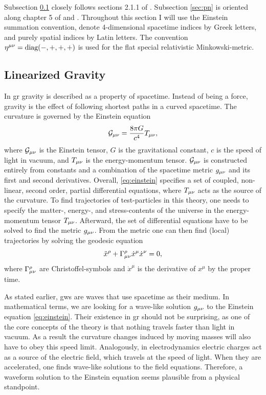 Subsection \ref{sec:linear_gravity} closely follows sections 2.1.1 of \cite{Schaefer:2019:MSC}. Subsection \ref{sec:pn} is oriented along chapter 5 of \cite{Maggiore:2008aaa} and \cite{Blanchet:2006aaa}. Throughout this section I will use the Einstein summation convention, denote 4-dimensional spacetime indices by Greek letters, and purely spatial indices by Latin letters. The convention $\eta^{\mu\nu}=\text{diag}{\left( -, +, +, + \right)}$ is used for the flat special relativistic Minkowski-metric.

\subsection{Linearized Gravity}\label{sec:linear_gravity}
In \acrshort{gr} gravity is described as a property of spacetime. Instead of being a force, gravity is the effect of following shortest paths in a curved spacetime. The curvature is governed by the Einstein equation
\begin{equation}\label{eq:einstein}
\mathcal{G}_{\mu\nu} = \frac{8\pi G}{c^4}T_{\mu\nu},
\end{equation}
where $\mathcal{G}_{\mu\nu}$ is the Einstein tensor, $G$ is the gravitational constant, $c$ is the speed of light in vacuum, and $T_{\mu\nu}$ is the energy-momentum tensor. $\mathcal{G}_{\mu\nu}$ is constructed entirely from constants and a combination of the spacetime metric $g_{\mu\nu}$ and its first and second derivatives. Overall, \eqref{eq:einstein} specifies a set of coupled, non-linear, second order, partial differential equations, where $T_{\mu\nu}$ acts as the source of the curvature. To find trajectories of test-particles in this theory, one needs to specify the matter-, energy-, and stress-contents of the universe in the energy-momentum tensor $T_{\mu\nu}$. Afterward, the set of differential equations have to be solved to find the metric $g_{\mu\nu}$. From the metric one can then find (local) trajectories by solving the geodesic equation
\begin{equation}\label{eq:geodesic_equation}
\ddot{x}^\rho + \Gamma^\rho_{\mu\nu}\dot{x}^\mu\dot{x}^\nu = 0,
\end{equation}
where $\Gamma^\rho_{\mu\nu}$ are Christoffel-symbols and $\dot{x}^\mu$ is the derivative of $x^\mu$ by the proper time.

As stated earlier, \acrshort{gw}s are waves that use spacetime as their medium. In mathematical terms, we are looking for a wave-like solution $g_{\mu\nu}$ to the Einstein equation \eqref{eq:einstein}. Their existence in \acrshort{gr} should not be surprising, as one of the core concepts of the theory is that nothing travels faster than light in vacuum. As a result the curvature changes induced by moving masses will also have to obey this speed limit. Analogously, in electrodynamics electric charges act as a source of the electric field, which travels at the speed of light. When they are accelerated, one finds wave-like solutions to the field equations. Therefore, a waveform solution to the Einstein equation seems plausible from a physical standpoint.

